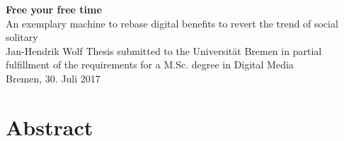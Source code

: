 \documentclass[12pt,numbers=noenddot,parskip,bibliography=totocnumbered,listof=totocnumbered]{scrreprt}
\begin{document}
	
\begin{titlepage}
\null
\vfill

\Huge\textsf{\textbf{Free your free time
\vspace{0.5em}}}\\
\LARGE\textsf{ An exemplary machine to rebase digital benefits to revert the trend of social solitary } %
\vspace{1.5em}\\
\Large\textsf{Jan-Hendrik Wolf}
\vfill
\vfill
\vfill
\small{Thesis submitted to the Universität Bremen in partial fulfillment of the requirements for a M.Sc. degree in Digital Media\\
Bremen, 30. Juli 2017}
\end{titlepage}


\tableofcontents

\chapter*{Abstract}
\end{document}
